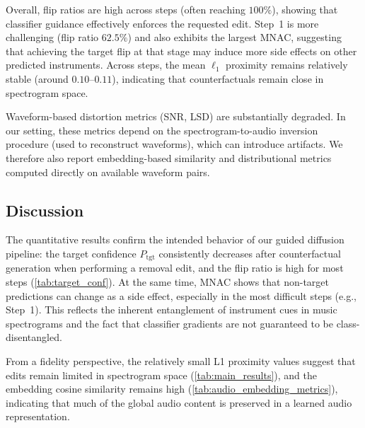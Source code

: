 \documentclass[11pt]{article}
\begin{document}
Overall, flip ratios are high across steps (often reaching $100\%$), showing
that classifier guidance effectively enforces the requested edit.
Step~1 is more challenging (flip ratio $62.5\%$) and also exhibits the largest
MNAC, suggesting that achieving the target flip at that stage may induce more
side effects on other predicted instruments.
Across steps, the mean $\ell_1$ proximity remains relatively stable (around
$0.10$--$0.11$), indicating that counterfactuals remain close in spectrogram
space.

Waveform-based distortion metrics (SNR, LSD) are substantially degraded.
In our setting, these metrics depend on the spectrogram-to-audio inversion
procedure (used to reconstruct waveforms), which can introduce artifacts.
We therefore also report embedding-based similarity and distributional metrics
computed directly on available waveform pairs.

\begin{table}[!ht]
  \centering
  \caption{Embedding-based similarity and realism metrics computed on waveform
    pairs available for evaluation. Cosine similarity is computed between
    embeddings of original and counterfactual waveforms. FAD compares the
  embedding distributions of original vs. counterfactual audio.}
  \label{tab:audio_embedding_metrics}
  
  \vspace{0.5em}
  
\end{table}

\subsection{Discussion}

The quantitative results confirm the intended behavior of our guided diffusion
pipeline: the target confidence $P_{\mathrm{tgt}}$ consistently decreases after
counterfactual generation when performing a removal edit, and the flip ratio is
high for most steps (\autoref{tab:target_conf}). At the same time, MNAC shows
that non-target predictions can change as a side effect, especially in the most
difficult steps (e.g., Step~1). This reflects the inherent entanglement of
instrument cues in music spectrograms and the fact that classifier gradients are
not guaranteed to be class-disentangled.

From a fidelity perspective, the relatively small L1 proximity values suggest
that edits remain limited in spectrogram space (\autoref{tab:main_results}), and
the embedding cosine similarity remains high
(\autoref{tab:audio_embedding_metrics}), indicating that much of the global
audio content is preserved in a learned audio representation.
\end{document}
